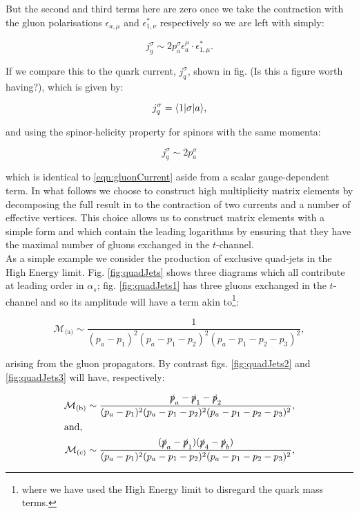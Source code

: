 		But the second and third terms here are zero once we take the contraction with the gluon polarisations $\epsilon_{a, \mu}$
		and $\epsilon_{1, \nu}^*$ respectively so we are left with simply:

		\begin{equation}
			j_{g}^\sigma \sim 2p_a^\sigma\epsilon_{a}^\mu\cdot\epsilon_{1, \mu}^*.
			\label{eqn:gluonCurrent}
		\end{equation}

		If we compare this to the quark current, $j_{q}^\sigma$, shown in fig. (Is this a figure worth having?),
		which is given by:

		\begin{equation}
			j_{q}^\sigma = \langle 1 | \sigma | a \rangle,
		\end{equation}

		and using the spinor-helicity property for spinors with the same momenta:

		\begin{equation}
			j_{q}^\sigma \sim 2p_a^\sigma
		\end{equation}

		which is identical to \eqref{eqn:gluonCurrent} aside from a scalar gauge-dependent term.  In what
		follows we choose to construct high multiplicity matrix elements by decomposing the full result
		in to the contraction of two currents and a number of effective vertices.  This choice allows us
		to construct matrix elements with a simple form and which contain the leading logarithms by
		ensuring that they have the maximal number of gluons exchanged in the $t$-channel.\\
		As a simple example we consider the production of exclusive quad-jets in the High Energy limit.
		Fig. \eqref{fig:quadJets} shows three diagrams which all contribute at leading order in $\alpha_s$;
		fig. \eqref{fig:quadJets1} has three gluons exchanged in the $t$-channel and so its amplitude will
		have a term akin to\footnote{where we have used the High Energy limit to disregard the quark mass terms.}:

		\begin{equation}
			\mathcal{M}_{\text{(a)}}\sim\frac{1}{(p_a - p_1)^2(p_a - p_1 - p_2)^2(p_a - p_1 - p_2 - p_3)^2},
		\end{equation}

		arising from the gluon propagators.  By contrast figs. \eqref{fig:quadJets2} and \eqref{fig:quadJets3} will
		have, respectively:

		\begin{align}
			\mathcal{M}_{\text{(b)}}\sim\frac{\slashed p_a - \slashed p_1 - \slashed p_2}
			{(p_a - p_1)^2(p_a - p_1 - p_2)^2(p_a - p_1 - p_2 - p_3)^2},\\
			\intertext{and,}
			\mathcal{M}_{\text{(c)}}\sim\frac{(\slashed p_a - \slashed p_1)(\slashed p_4 - \slashed p_b)}
			{(p_a - p_1)^2(p_a - p_1 - p_2)^2(p_a - p_1 - p_2 - p_3)^2},
		\end{align}

